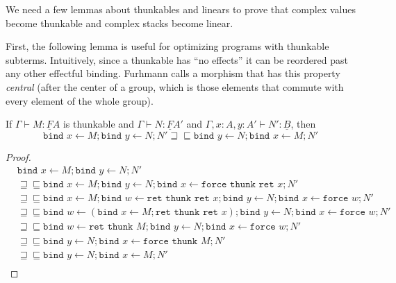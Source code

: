 \documentclass[acmsmall,nonacm]{acmart}
\renewcommand{\u}{\underline}
\newcommand{\ltdyn}{\sqsubseteq}
\newcommand{\gtdyn}{\sqsupseteq}
\newcommand{\equidyn}{\mathrel{\gtdyn\ltdyn}}
\newcommand{\bindXtoYinZ}[2]{\kw{bind}#2 \leftarrow #1;}
\newcommand{\kw}[1]{\texttt{#1}\,\,}
\newcommand{\ret}{\kw{ret}}
\newcommand{\thunk}{\kw{thunk}}
\newcommand{\force}{\kw{force}}
\begin{document}
{\begin{longonly}
We need a few lemmas about thunkables and linears to prove that complex
values become thunkable and complex stacks become linear.

First, the following lemma is useful for optimizing programs with
thunkable subterms.  Intuitively, since a thunkable has ``no effects''
it can be reordered past any other effectful binding.  Furhmann
\citep{fuhrmann1999direct} calls a morphism that has this property
\emph{central} (after the center of a group, which is those elements
that commute with every element of the whole group).
\begin{lemma}
  If $\Gamma \vdash M : \u F A$ is thunkable and $\Gamma \vdash N : \u
  F A'$ and $\Gamma , x:A, y:A' \vdash N' : \u B$, then
  \[
  \bindXtoYinZ M x \bindXtoYinZ N y N'
  \equidyn
 \bindXtoYinZ N y \bindXtoYinZ M x N'
  \]
\end{lemma}
\begin{proof}
  \begin{align*}
    &\bindXtoYinZ M x \bindXtoYinZ N y N'\\
    &\equidyn
    \bindXtoYinZ M x \bindXtoYinZ N y \bindXtoYinZ {\force \thunk \ret x} x N' \tag{$U\beta,\u F\beta$}\\
    &\equidyn\bindXtoYinZ M x \bindXtoYinZ {\ret\thunk\ret x} w \bindXtoYinZ N y \bindXtoYinZ {\force w} x N' \tag{$\u F\beta$}\\
    &\equidyn\bindXtoYinZ {(\bindXtoYinZ M x {\ret\thunk\ret x})} w \bindXtoYinZ N y \bindXtoYinZ {\force w} x N' \tag{$\u F\eta$}\\
    &\equidyn\bindXtoYinZ {\ret \thunk M} w \bindXtoYinZ N y \bindXtoYinZ {\force w} x N' \tag{$M$ thunkable}\\    
    &\equidyn\bindXtoYinZ N y \bindXtoYinZ {\force \thunk M} x N' \tag{$\u F\beta$}\\
    &\equidyn\bindXtoYinZ N y \bindXtoYinZ M x N' \tag{$U\beta$}\\    
  \end{align*}
\end{proof}


\end{longonly}}
\end{document}
